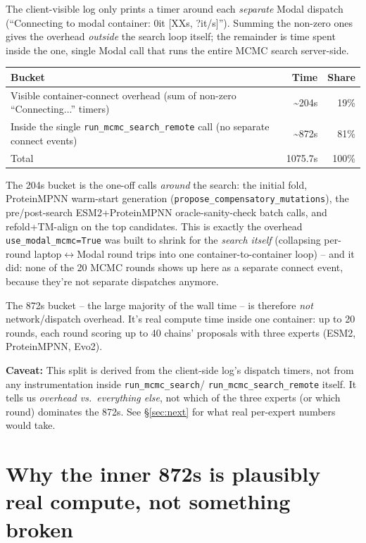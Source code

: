 \documentclass[11pt]{article}
\newcommand{\warnbox}[1]{%
  \par\noindent\colorbox{warnbg}{\parbox{\dimexpr\linewidth-2\fboxsep}{\textbf{Caveat:} #1}}\par\vspace{4pt}
}
\begin{document}
The client-visible log only prints a timer around each \emph{separate} Modal
dispatch (``Connecting to modal container: 0it [XXs, ?it/s]''). Summing the
non-zero ones gives the overhead \emph{outside} the search loop itself; the
remainder is time spent inside the one, single Modal call that runs the
entire MCMC search server-side.

\begin{center}
\begin{tabular}{@{}lrr@{}}
\toprule
Bucket & Time & Share \\
\midrule
Visible container-connect overhead (sum of non-zero ``Connecting...'' timers) & \textasciitilde 204s & 19\% \\
Inside the single \texttt{run\_mcmc\_search\_remote} call (no separate connect events) & \textasciitilde 872s & 81\% \\
\midrule
Total & 1075.7s & 100\% \\
\bottomrule
\end{tabular}
\end{center}

The 204s bucket is the one-off calls \emph{around} the search: the initial
fold, ProteinMPNN warm-start generation (\texttt{propose\_compensatory\_mutations}),
the pre/post-search ESM2+ProteinMPNN oracle-sanity-check batch calls, and
refold+TM-align on the top candidates. This is exactly the overhead
\texttt{use\_modal\_mcmc=True} was built to shrink for the \emph{search
itself} (collapsing per-round laptop$\leftrightarrow$Modal round trips into
one container-to-container loop) -- and it did: none of the 20 MCMC rounds
shows up here as a separate connect event, because they're not separate
dispatches anymore.

The 872s bucket -- the large majority of the wall time -- is therefore
\emph{not} network/dispatch overhead. It's real compute time inside one
container: up to 20 rounds, each round scoring up to 40 chains' proposals
with three experts (ESM2, ProteinMPNN, Evo2).

\warnbox{This split is derived from the client-side log's dispatch timers,
not from any instrumentation inside \texttt{run\_mcmc\_search}/
\texttt{run\_mcmc\_search\_remote} itself. It tells us \emph{overhead vs.\
everything else}, not which of the three experts (or which round) dominates
the 872s. See \S\ref{sec:next} for what real per-expert numbers would take.}

\section{Why the inner 872s is plausibly real compute, not something broken}
\end{document}
